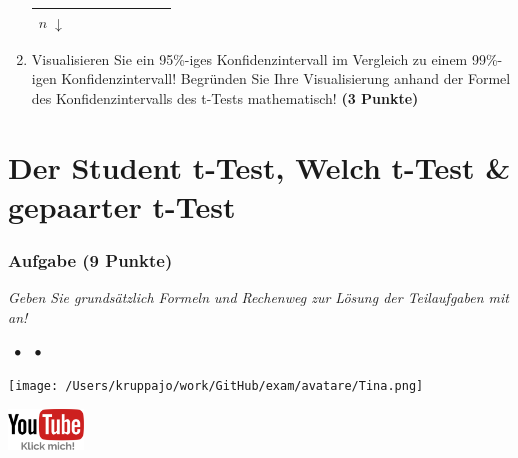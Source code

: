 \documentclass[a4paper, 9pt]{scrartcl}\usepackage[]{graphicx}\usepackage[]{xcolor}
\begin{document}
\begin{enumerate}
\begin{center}
\begin{tabular}[c]{l|c|c|c|l|c|c|c}
{                                                          $n\; \downarrow$} &
                                                                          \hspace{1.8cm}
                                                & \hspace{1.8cm}  & \hspace{1.8cm}\strut\\
    \hline
  \end{tabular}
\end{center}
\item Visualisieren Sie ein 95\%-iges Konfidenzintervall im Vergleich zu einem 99\%-igen Konfidenzintervall! Begründen Sie Ihre Visualisierung anhand der Formel des Konfidenzintervalls des t-Tests mathematisch! \textbf{(3 Punkte)} 
\end{enumerate} 
\clearpage
\part{Der Student t-Test, Welch t-Test \& gepaarter t-Test}

\section{Aufgabe \hfill (9 Punkte)}

\textit{Geben Sie grundsätzlich Formeln und Rechenweg zur Lösung der Teilaufgaben mit an!} \\[1Ex]
 

 
\ifcollection
\begin{flushright}
\tiny\vspace{-3Ex}
\textbf{\examinhaltstart}
\exammodulemathstat $\;\bullet$
\exammodulestat $\;\bullet$
\exammodulestatbbv 
\vspace{-4Ex}
\end{flushright}
\begin{minipage}[t]{0.5\textwidth}
\texttt{[image: /Users/kruppajo/work/GitHub/exam/avatare/Tina.png]}
\end{minipage}
\begin{minipage}[t]{0.5\textwidth}
\hfill
\href{https://youtu.be/eejS2uG4o-M}{\includegraphics[width = 2cm]{img/youtube}}
\end{minipage}
\vspace{-3ex}
\fi
\end{document}
